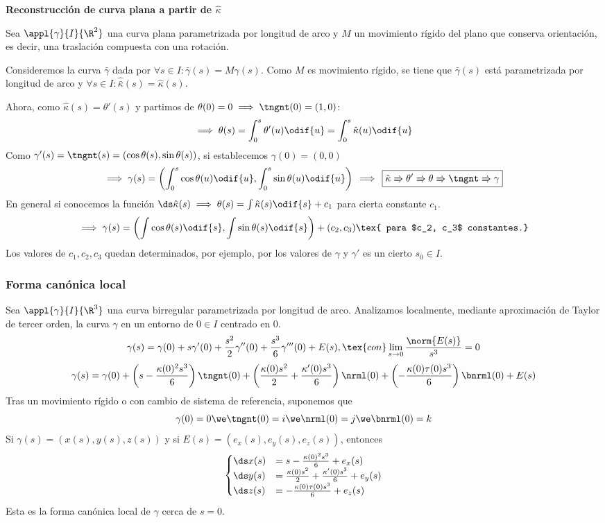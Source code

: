 \textbf{Reconstrucción de curva plana a partir de $\hat{\kappa}$}

Sea $\appl{\gamma}{I}{\R^2}$ una curva plana parametrizada por longitud de arco y $M$ un movimiento rígido del plano que conserva orientación, es decir, una traslación compuesta con una rotación.

Consideremos la curva $\bar{\gamma}$ dada por $\forall s \in I : \bar{\gamma}(s)=M\gamma(s)$. Como $M$ es movimiento rígido, se tiene que $\bar{\gamma}(s)$ está parametrizada por longitud de arco y $\forall s \in I : \hat{\bar{\kappa}}(s)=\hat{\kappa}(s)$.

Ahora, como $\hat{\kappa}(s)=\theta'(s)$ y partimos de $\theta(0)=0 \implies \tngnt(0)=(1,0)$:
\[\implies \theta(s)=\int_{0}^{s}\theta'(u)\odif{u} = \int_0^s\hat{\kappa}(u) \odif{u}\]
Como $\gamma'(s)=\tngnt(s)=(\cos{\theta(s)}, \sin{\theta(s)})$, si establecemos $\gamma(0)=(0, 0)$
\[\implies\gamma(s)=\left(\int_0^s\cos{\theta(u)} \odif{u},\int_0^s\sin{\theta(u)} \odif{u}\right) \, \implies \, \boxed{\hat{\kappa} \Rrightarrow \theta' \Rrightarrow \theta \Rrightarrow \tngnt \Rrightarrow \gamma}\]
En general si conocemos la función $\ds \hat{\kappa}(s) \implies \theta(s) = \int \hat{\kappa}(s)\odif{s} + c_1$ para cierta constante $c_1$.
\[\implies \gamma(s)=\left(\int \cos{\theta(s)} \odif{s}, \int \sin{\theta(s)}\odif{s}\right) + (c_2, c_3) \tex{ para $c_2, c_3$ constantes.}\]
Los valores de $c_1, c_2, c_3$ quedan determinados, por ejemplo, por los valores de $\gamma$ y $\gamma'$ es un cierto $s_0\in I$.

\subsubsection{Forma canónica local}

Sea $\appl{\gamma}{I}{\R^3}$ una curva birregular parametrizada por longitud de arco.
Analizamos localmente, mediante aproximación de Taylor de tercer orden, la curva $\gamma$ en un entorno de $0 \in I$ centrado en $0$.
\[\gamma(s)=\gamma(0) + s\gamma'(0) + \frac{s^2}{2} \gamma''(0) + \frac{s^3}{6}\gamma'''(0) + E(s), \tex{ con }\lim_{s\to0}\frac{\norm{E(s)}}{s^3} = 0\]
\[\gamma(s)=\gamma(0) + \left(s-\frac{\kappa(0)^2s^3}{6}\right)\tngnt(0) + \left(\frac{\kappa(0)s^2}{2} + \frac{\kappa'(0)s^3}{6}\right)\nrml(0) + \left(-\frac{\kappa(0)\tau(0)s^3}{6}\right)\bnrml(0) + E(s)\]
Tras un movimiento rígido o con cambio de sistema de referencia, suponemos que
\[\gamma(0)=0 \we \tngnt(0)=i \we \nrml(0)=j \we \bnrml(0)=k\]
Si $\gamma(s)=(x(s), y(s), z(s))$ y si $E(s)=(e_x(s), e_y(s), e_z(s))$, entonces
\[\begin{cases}
		\ds x(s) & = s - \frac{\kappa(0)^2s^3}{6} + e_x(s)                     \\
		\ds y(s) & = \frac{\kappa(0)s^2}{2} + \frac{\kappa'(0)s^3}{6} + e_y(s) \\
		\ds z(s) & = -\frac{\kappa(0)\tau(0)s^3}{6} + e_z(s)
	\end{cases}\]
Esta es la forma canónica local de $\gamma$ cerca de $s=0$.

